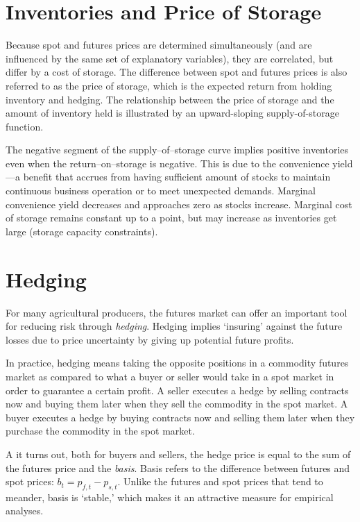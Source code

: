 \documentclass[
  oneside]{book}
\begin{document}
\hypertarget{inventories-and-price-of-storage}{%
\section{Inventories and Price of Storage}\label{inventories-and-price-of-storage}}

Because spot and futures prices are determined simultaneously (and are influenced by the same set of explanatory variables), they are correlated, but differ by a cost of storage. The difference between spot and futures prices is also referred to as the price of storage, which is the expected return from holding inventory and hedging. The relationship between the price of storage and the amount of inventory held is illustrated by an upward-sloping supply-of-storage function.

The negative segment of the supply--of--storage curve implies positive inventories even when the return--on--storage is negative. This is due to the convenience yield---a benefit that accrues from having sufficient amount of stocks to maintain continuous business operation or to meet unexpected demands. Marginal convenience yield decreases and approaches zero as stocks increase. Marginal cost of storage remains constant up to a point, but may increase as inventories get large (storage capacity constraints).

\hypertarget{hedging}{%
\section{Hedging}\label{hedging}}

For many agricultural producers, the futures market can offer an important tool for reducing risk through \emph{hedging}. Hedging implies `insuring' against the future losses due to price uncertainty by giving up potential future profits.

In practice, hedging means taking the opposite positions in a commodity futures market as compared to what a buyer or seller would take in a spot market in order to guarantee a certain profit. A seller executes a hedge by selling contracts now and buying them later when they sell the commodity in the spot market. A buyer executes a hedge by buying contracts now and selling them later when they purchase the commodity in the spot market.

A it turns out, both for buyers and sellers, the hedge price is equal to the sum of the futures price and the \emph{basis}. Basis refers to the difference between futures and spot prices: \(b_{t} = p_{f,t}-p_{s,t}\). Unlike the futures and spot prices that tend to meander, basis is `stable,' which makes it an attractive measure for empirical analyses.
\end{document}
